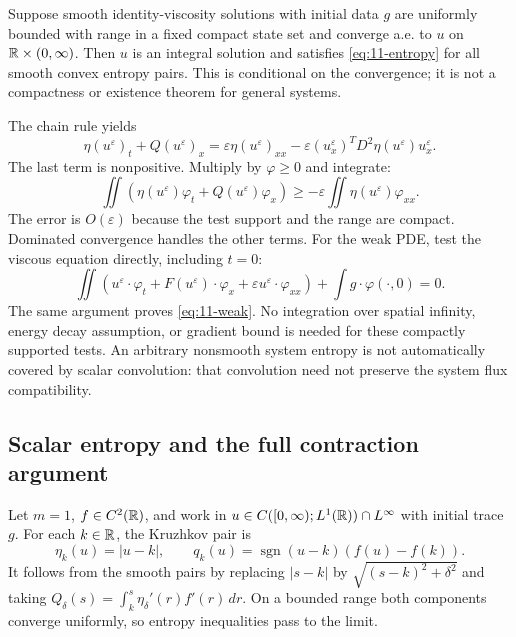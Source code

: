 \begin{theorem}
Suppose smooth identity-viscosity solutions with initial data $g$
are uniformly bounded with range in a fixed compact state set and
converge a.e. to $u$ on $\mathbb{R}\times(0,\infty)$. Then $u$ is an
integral solution and satisfies \eqref{eq:11-entropy} for all smooth
convex entropy pairs. This is conditional on the convergence; it
is not a compactness or existence theorem for general systems.
\end{theorem}
\begin{expandedproof}
The chain rule yields
\[
 \eta(u^\varepsilon)_t+Q(u^\varepsilon)_x
 =\varepsilon\eta(u^\varepsilon)_{xx}
 -\varepsilon (u_x^\varepsilon)^TD^2\eta(u^\varepsilon)u_x^\varepsilon.
\]
The last term is nonpositive. Multiply by $\varphi\ge0$ and integrate:
\[
 \iint(\eta(u^\varepsilon)\varphi_t+Q(u^\varepsilon)\varphi_x)
 \ge-\varepsilon\iint\eta(u^\varepsilon)\varphi_{xx}.
\]
The error is $O(\varepsilon)$ because the test support and the range
are compact. Dominated convergence handles the other terms. For the
weak PDE, test the viscous equation directly, including $t=0$:
\[
 \iint(u^\varepsilon\cdot\varphi_t+F(u^\varepsilon)\cdot\varphi_x
 +\varepsilon u^\varepsilon\cdot\varphi_{xx})
 +\int g\cdot\varphi(\cdot,0)=0.
\]
The same argument proves \eqref{eq:11-weak}. No integration over
spatial infinity, energy decay assumption, or gradient bound is
needed for these compactly supported tests. An arbitrary nonsmooth
system entropy is not automatically covered by scalar convolution:
that convolution need not preserve the system flux compatibility.
\end{expandedproof}

\subsection{Scalar entropy and the full contraction argument}
Let $m=1$, $f\in C^2(\mathbb{R})$, and work in
$u\in C([0,\infty);L^1(\mathbb{R}))\cap L^\infty$ with initial trace $g$.
For each $k\in\mathbb{R}$, the Kruzhkov pair is
\[
 \eta_k(u)=|u-k|,\qquad
 q_k(u)=\operatorname{sgn}(u-k)(f(u)-f(k)).
\]
It follows from the smooth pairs by replacing $|s-k|$ by
$\sqrt{(s-k)^2+\delta^2}$ and taking
$Q_\delta(s)=\int_k^s\eta_\delta'(r)f'(r)\,dr$.
On a bounded range both components converge uniformly, so entropy
inequalities pass to the limit.

